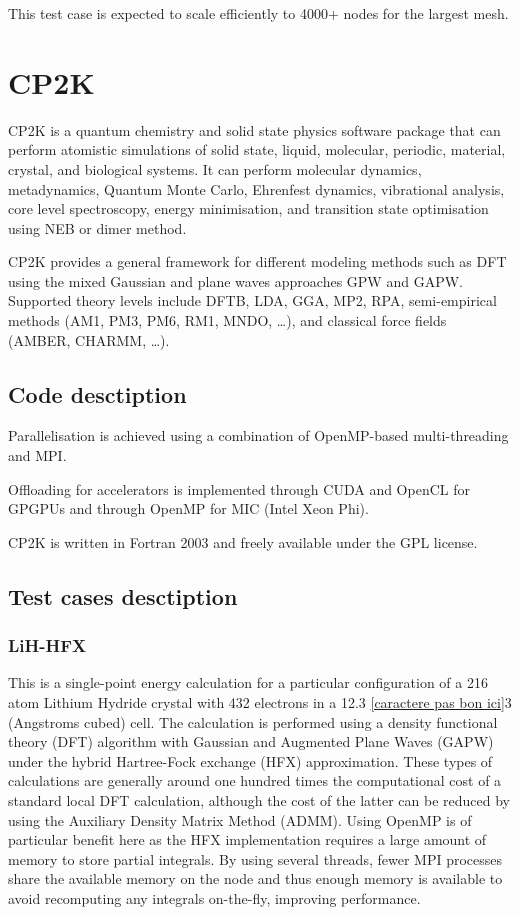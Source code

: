 This test case is expected to scale efficiently to 4000+ nodes for the largest mesh.

\section{CP2K}
CP2K is a quantum chemistry and solid state physics software package that can perform atomistic simulations of solid state, liquid, molecular, periodic, material, crystal, and biological systems. It can perform molecular dynamics, metadynamics, Quantum Monte Carlo, Ehrenfest dynamics, vibrational analysis, core level spectroscopy, energy minimisation, and transition state optimisation using NEB or dimer method.

CP2K provides a general framework for different modeling methods such as DFT using the mixed Gaussian and plane waves approaches GPW and GAPW. Supported theory levels include DFTB, LDA, GGA, MP2, RPA, semi-empirical methods (AM1, PM3, PM6, RM1, MNDO, …), and classical force fields (AMBER, CHARMM, …).

\subsection{Code desctiption}
Parallelisation is achieved using a combination of OpenMP-based multi-threading and MPI.

Offloading for accelerators is implemented through CUDA and OpenCL for GPGPUs and through OpenMP for MIC (Intel Xeon Phi).

CP2K is written in Fortran 2003 and freely available under the GPL license.

\subsection{Test cases desctiption}
\subsubsection{LiH-HFX}
This is a single-point energy calculation for a particular configuration of a 216 atom Lithium Hydride crystal with 432 electrons in a 12.3 \ref{caractere pas bon ici}3 (Angstroms cubed) cell. The calculation is performed using a density functional theory (DFT) algorithm with Gaussian and Augmented Plane Waves (GAPW) under the hybrid Hartree-Fock exchange (HFX) approximation. These types of calculations are generally around one hundred times the computational cost of a standard local DFT calculation, although the cost of the latter can be reduced by using the Auxiliary Density Matrix Method (ADMM). Using OpenMP is of particular benefit here as the HFX implementation requires a large amount of memory to store partial integrals. By using several threads, fewer MPI processes share the available memory on the node and thus enough memory is available to avoid recomputing any integrals on-the-fly, improving performance.

